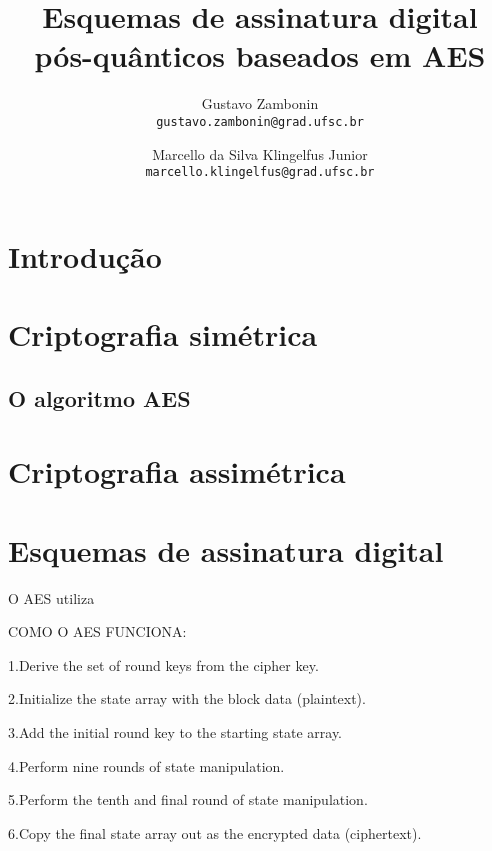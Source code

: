\documentclass{article}
\title{Esquemas de assinatura digital pós-quânticos baseados em AES}
\author{Gustavo Zambonin \\ \texttt{gustavo.zambonin@grad.ufsc.br} \and Marcello da Silva Klingelfus Junior \\ \texttt{marcello.klingelfus@grad.ufsc.br}}
\date{}
\begin{document}
\maketitle


\section*{Introdução}

\section*{Criptografia simétrica}

\subsection*{O algoritmo AES}

\section*{Criptografia assimétrica}

\subsection*{}

\section*{Esquemas de assinatura digital}


O AES utiliza


COMO O AES FUNCIONA:

1.Derive the set of round keys from the cipher key.

2.Initialize the state array with the block data (plaintext).

3.Add the initial round key to the starting state array.

4.Perform nine rounds of state manipulation.

5.Perform the tenth and final round of state manipulation.

6.Copy the final state array out as the encrypted data (ciphertext).
\end{document}
